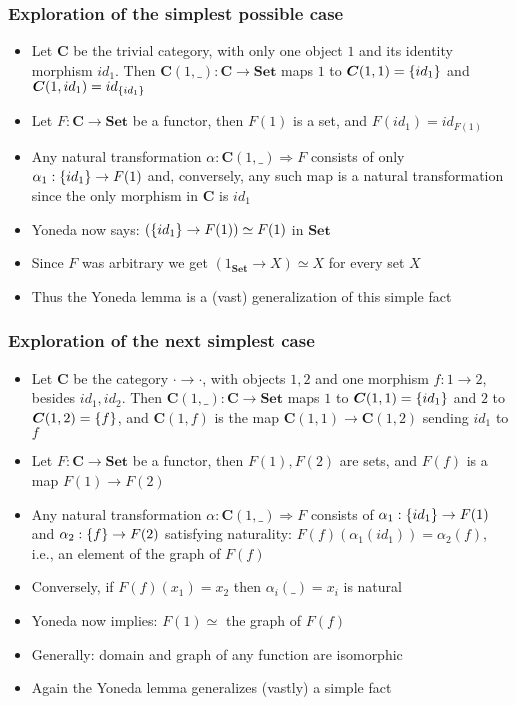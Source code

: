 \documentclass[handout]{beamer}
\newcommand{\To}{\Rightarrow}
\newcommand{\bfsf}[1]{{\boldsymbol{#1}}}
\newcommand{\Set}{\bfsf{Set}}
\newcommand{\CC}{\bfsf{C}}
\begin{document}
\frame
  {   
    \frametitle{Exploration of the simplest possible case}\label{Yon:Triv}

 \begin{itemize}[<+->]
\item Let $\CC$ be the trivial category, with only one object $1$ and
 its identity morphism $id_1$. Then $\CC(1,\_):\CC\to\Set$ maps
$1$ to $\CC(1,1) = \set{id_1}$ and $\CC(1,id_1) = id_{\set{id_1}}$
\item Let $F:\CC\to\Set$ be a functor, then $F(1)$ is a set, and
$F(id_1) = id_{F(1)}$
\item Any natural transformation $\alpha: \CC(1,\_)\To F$ consists of
only $\alpha_1: \{id_1\} \to F(1)$ and,
conversely, any such map is a natural transformation
since the only morphism in $\CC$ is $id_1$
\item Yoneda now says:  $(\{id_1\} \to F(1)) \simeq F(1)$ in $\Set$
\item Since $F$ was arbitrary we get  $(1_\Set \to X) \simeq X$ for every set $X$
\item Thus the Yoneda lemma is a (vast) generalization of this simple fact
 \end{itemize}

 }

\frame
  {   
    \frametitle{Exploration of the next simplest case}\label{Yon:Triv}

 \begin{itemize}[<+->]
\item Let $\CC$ be the category ${\cdot}{\to}{\cdot}$, with objects $1,2$ and
one morphism $f:1\to 2$, besides $id_1,id_2$. Then $\CC(1,\_):\CC\to\Set$ maps
$1$ to $\CC(1,1) = \set{id_1}$ and $2$ to $\CC(1,2) = \set{f}$, and
$\CC(1,f)$ is the map $\CC(1,1)\to\CC(1,2)$ sending $id_1$ to $f$  
\item Let $F:\CC\to\Set$ be a functor, then $F(1), F(2)$ are sets, and
$F(f)$ is a map ${F(1)}\to{F(2)}$
\item Any natural transformation $\alpha: \CC(1,\_)\To F$ consists of
$\alpha_1: \{id_1\} \to F(1)$ and $\alpha_2: \{f\} \to F(2)$ satisfying 
naturality: $F(f)(\alpha_1(id_1)) = \alpha_2(f)$, i.e., an element of the graph of $F(f)$
\item Conversely, if $F(f)(x_1) = x_2$ then  $\alpha_i(\_) = x_i$ is natural

\item Yoneda now implies:   $F(1) \simeq{}$ the graph of $F(f)$
\item Generally: domain and graph of any function are isomorphic
\item Again  the Yoneda lemma generalizes (vastly) a simple fact
 \end{itemize}

 }
\end{document}
